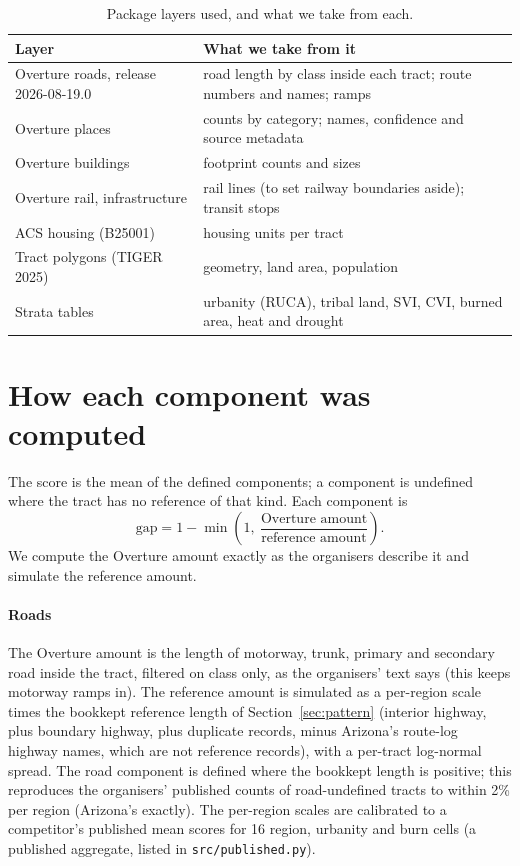 \documentclass[10pt,twocolumn,a4paper]{article}
\newcommand{\code}[1]{\texttt{\small #1}}
\begin{document}
\begin{table}[t]
\centering\small
\caption{Package layers used, and what we take from each.}
\label{tab:data}
\begin{tabularx}{\columnwidth}{@{}>{\raggedright\arraybackslash}p{}L@{}}
\toprule
Layer & What we take from it\\
\midrule
Overture roads, release 2026-08-19.0~\cite{overture} & road length by class inside each tract; route numbers and names; ramps\\
Overture places & counts by category; names, confidence and source metadata\\
Overture buildings & footprint counts and sizes\\
Overture rail, infrastructure & rail lines (to set railway boundaries aside); transit stops\\
ACS housing (B25001) & housing units per tract\\
Tract polygons (TIGER 2025) & geometry, land area, population\\
Strata tables & urbanity (RUCA), tribal land, SVI, CVI, burned area, heat and drought\\
\bottomrule
\end{tabularx}
\end{table}

\section{How each component was computed}
\label{sec:components}
The score is the mean of the defined components; a component is undefined where the tract has no reference of that kind.
Each component is
\begin{equation*}
\text{gap} = 1-\min\!\left(1,\ \frac{\text{Overture amount}}{\text{reference amount}}\right).
\end{equation*}
We compute the Overture amount exactly as the organisers describe it and simulate the reference amount.

\paragraph{Roads} The Overture amount is the length of motorway, trunk, primary and secondary road inside the tract,
filtered on class only, as the organisers' text says (this keeps motorway ramps in). The reference amount is simulated as
a per-region scale times the bookkept reference length of Section~\ref{sec:pattern} (interior highway, plus boundary
highway, plus duplicate records, minus Arizona's route-log highway names, which are not reference records), with a
per-tract log-normal spread. The road component is defined where the bookkept length is positive; this reproduces the
organisers' published counts of road-undefined tracts to within 2\% per region (Arizona's exactly). The per-region scales
are calibrated to a competitor's published mean scores for 16 region, urbanity and burn cells (a published aggregate,
listed in \code{src/published.py}).
\end{document}
